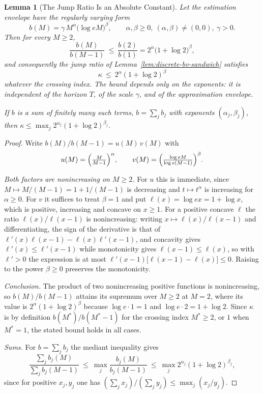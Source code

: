 \documentclass[12pt]{article}
\newtheorem{lemma}[theorem]{Lemma}
\theoremstyle{definition}
\begin{document}
\begin{lemma}[The Jump Ratio Is an Absolute Constant]
\label{lem:kappa-bounded}
Let the estimation envelope have the regularly varying form
\[
b(M)=\gamma\,M^{\alpha}\bigl(\log eM\bigr)^{\beta},
\qquad
\alpha,\beta\ge0,\ (\alpha,\beta)\ne(0,0),\ \gamma>0 .
\]
Then for every $M\ge2$,
\[
\frac{b(M)}{b(M-1)}
\ \le\
\frac{b(2)}{b(1)}
=
2^{\alpha}\bigl(1+\log2\bigr)^{\beta},
\]
and consequently the jump ratio of Lemma~\ref{lem:discrete-bv-sandwich}
satisfies
\[
\kappa\ \le\ 2^{\alpha}(1+\log2)^{\beta}
\]
whatever the crossing index.  The bound depends only on the exponents: it is
independent of the horizon $T$, of the scale $\gamma$, and of the
approximation envelope.

If $b$ is a sum of finitely many such terms, $b=\sum_jb_j$ with exponents
$(\alpha_j,\beta_j)$, then
$\kappa\le\max_j2^{\alpha_j}(1+\log2)^{\beta_j}$.
\end{lemma}

\begin{proof}
Write $b(M)/b(M-1)=u(M)\,v(M)$ with
\[
u(M)=\Bigl(\tfrac{M}{M-1}\Bigr)^{\alpha},
\qquad
v(M)=\Bigl(\tfrac{\log eM}{\log e(M-1)}\Bigr)^{\beta}.
\]

\emph{Both factors are nonincreasing on $M\ge2$.}  For $u$ this is immediate,
since $M\mapsto M/(M-1)=1+1/(M-1)$ is decreasing and $t\mapsto t^\alpha$ is
increasing for $\alpha\ge0$.  For $v$ it suffices to treat $\beta=1$ and put
$\ell(x)=\log ex=1+\log x$, which is positive, increasing and concave on
$x\ge1$.  For a positive concave $\ell$ the ratio $\ell(x)/\ell(x-1)$ is
nonincreasing: writing $x\mapsto\ell(x)/\ell(x-1)$ and differentiating, the
sign of the derivative is that of
$\ell'(x)\ell(x-1)-\ell(x)\ell'(x-1)$, and concavity gives
$\ell'(x)\le\ell'(x-1)$ while monotonicity gives $\ell(x-1)\le\ell(x)$, so with
$\ell'>0$ the expression is at most
$\ell'(x-1)\bigl[\ell(x-1)-\ell(x)\bigr]\le0$.  Raising to the power $\beta\ge0$
preserves the monotonicity.

\emph{Conclusion.}  The product of two nonincreasing positive functions is
nonincreasing, so $b(M)/b(M-1)$ attains its supremum over $M\ge2$ at $M=2$,
where its value is $2^{\alpha}(1+\log2)^{\beta}$ because $\log e\cdot1=1$ and
$\log e\cdot2=1+\log2$.  Since $\kappa$ is by definition $b(M^\ast)/b(M^\ast-1)$
for the crossing index $M^\ast\ge2$, or $1$ when $M^\ast=1$, the stated bound
holds in all cases.

\emph{Sums.}  For $b=\sum_jb_j$ the mediant inequality gives
\[
\frac{\sum_jb_j(M)}{\sum_jb_j(M-1)}
\ \le\
\max_j\frac{b_j(M)}{b_j(M-1)}
\ \le\
\max_j2^{\alpha_j}(1+\log2)^{\beta_j},
\]
since for positive $x_j,y_j$ one has
$(\sum_jx_j)/(\sum_jy_j)\le\max_j(x_j/y_j)$.
\end{proof}
\end{document}
